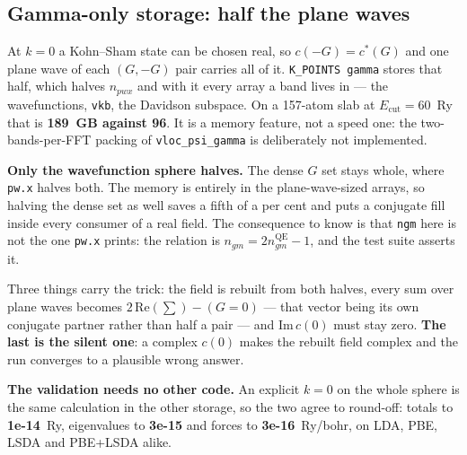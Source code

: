 \documentclass[11pt,a4paper]{article}
\newcommand{\code}[1]{\texttt{\small #1}}
\begin{document}
\subsection*{Gamma-only storage: half the plane waves}

At $k=0$ a Kohn--Sham state can be chosen real, so $c(-G)=c^*(G)$ and one plane
wave of each $(G,-G)$ pair carries all of it. \code{K\_POINTS gamma} stores that
half, which halves $n_{pwx}$ and with it every array a band lives in --- the
wavefunctions, \code{vkb}, the Davidson subspace. On a 157-atom slab at
$E_{\mathrm{cut}}=60$~Ry that is \textbf{189~GB against 96}. It is a memory
feature, not a speed one: the two-bands-per-FFT packing of
\code{vloc\_psi\_gamma} is deliberately not implemented.

\textbf{Only the wavefunction sphere halves.} The dense $G$ set stays whole,
where \code{pw.x} halves both. The memory is entirely in the plane-wave-sized
arrays, so halving the dense set as well saves a fifth of a per cent and puts a
conjugate fill inside every consumer of a real field. The consequence to know is
that \code{ngm} here is not the one \code{pw.x} prints: the relation is
$n_{gm} = 2 n_{gm}^{\mathrm{QE}} - 1$, and the test suite asserts it.

Three things carry the trick: the field is rebuilt from both halves, every sum
over plane waves becomes $2\,\mathrm{Re}(\sum) - (G{=}0)$ --- that vector being
its own conjugate partner rather than half a pair --- and $\mathrm{Im}\,c(0)$
must stay zero. \textbf{The last is the silent one}: a complex $c(0)$ makes the
rebuilt field complex and the run converges to a plausible wrong answer.

\textbf{The validation needs no other code.} An explicit $k=0$ on the whole
sphere is the same calculation in the other storage, so the two agree to
round-off: totals to \textbf{1e-14}~Ry, eigenvalues to \textbf{3e-15} and forces
to \textbf{3e-16}~Ry/bohr, on LDA, PBE, LSDA and PBE+LSDA alike.
\end{document}
